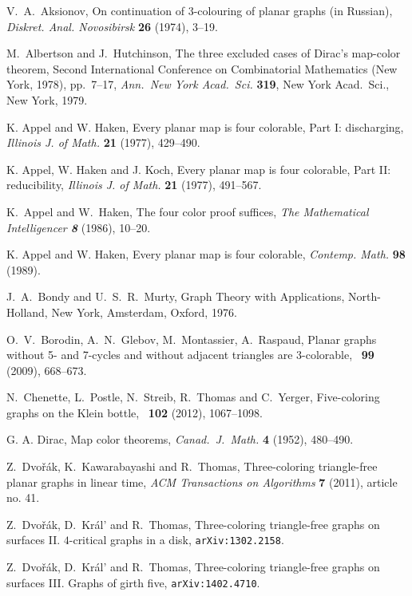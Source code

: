 \documentclass{article}
\begin{document}
\begin{thebibliography}{99}
 V.~A.~Aksionov,
On continuation of $3$-colouring of planar graphs (in Russian),
{\em Diskret. Anal.  Novosibirsk} {\bf 26} (1974), 3--19.

 M.~Albertson and J.~Hutchinson,
The three excluded cases of Dirac's map-color theorem,
 Second International Conference on Combinatorial Mathematics
(New York, 1978),  pp.~7--17,
{\it Ann.\ New York Acad.\ Sci.} {\bf 319}, New York Acad.\ Sci.,
New York, 1979.

 K. Appel and W. Haken,
Every planar map is four colorable, Part I: discharging,
{\it Illinois J. of Math.} {\bf 21} (1977), 429--490.

 K. Appel, W. Haken and J. Koch,
Every planar map is four colorable, Part II: reducibility,
{\it Illinois J. of Math.} {\bf 21} (1977), 491--567.

 K.~Appel and W.~Haken,
The four color proof suffices,
{\it The Mathematical Intelligencer \bf 8} (1986), 10--20.

 K. Appel and W. Haken,
Every planar map is four colorable,
{\it Contemp. Math.} {\bf 98} (1989).

 J.~A.~Bondy and U.~S.~R.~Murty,
Graph Theory with Applications,
North-Holland, New York, Amsterdam, Oxford, 1976.

 O.~V.~Borodin, A.~N.~Glebov, M.~Montassier, A.~Raspaud,
Planar graphs without 5- and 7-cycles and without adjacent triangles are 3-colorable,
\JCTB\ {\bf99} (2009), 668--673.

 N.~Chenette, L.~Postle, N.~Streib, R.~Thomas and C.~Yerger,
Five-coloring graphs on the Klein bottle,
\JCTB\ {\bf 102} (2012), 1067--1098.

 G. A. Dirac, Map color theorems,
{\it Canad.\ J.~Math.} {\bf 4} (1952), 480--490.

 Z.~Dvo\v{r}\'ak, K.~Kawarabayashi and R.~Thomas,
Three-coloring triangle-free planar graphs in linear time,
{\it ACM Transactions on Algorithms} {\bf 7} (2011), article no. 41.

 Z.~Dvo\v{r}\'ak, D.~Kr\'al' and R.~Thomas,
Three-coloring triangle-free graphs on surfaces II. 
$4$-critical graphs in a disk, {\tt arXiv:1302.2158}.

 Z.~Dvo\v{r}\'ak, D.~Kr\'al' and R.~Thomas,
Three-coloring triangle-free graphs on surfaces III. Graphs of girth five, 
{\tt arXiv:1402.4710}.


\end{thebibliography}
\end{document}
